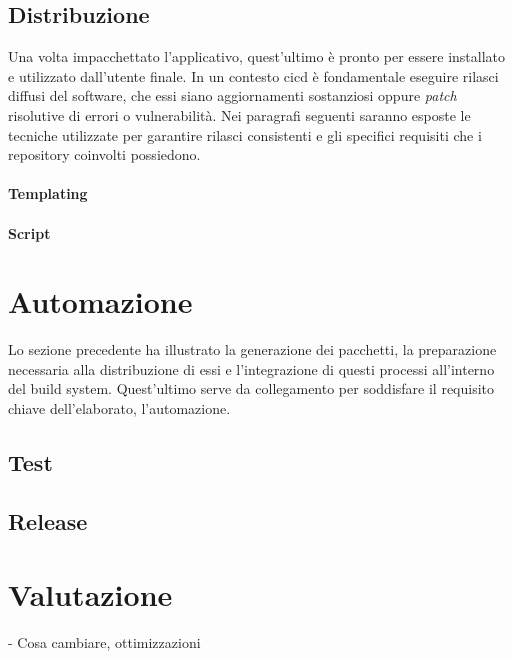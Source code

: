 
\subsection{Distribuzione}

Una volta impacchettato l'applicativo, quest'ultimo è pronto per essere installato e utilizzato dall'utente finale. In un contesto \ac{cicd} è fondamentale eseguire rilasci diffusi del software, che essi siano aggiornamenti sostanziosi oppure \textit{patch} risolutive di errori o vulnerabilità. Nei paragrafi seguenti saranno esposte le tecniche utilizzate per garantire rilasci consistenti e gli specifici requisiti che i repository coinvolti possiedono.

\paragraph{Templating}



\paragraph{Script}

\section{Automazione}
Lo sezione precedente ha illustrato la generazione dei pacchetti, la preparazione necessaria alla distribuzione di essi e l'integrazione di questi processi all'interno del build system. Quest'ultimo serve da collegamento per soddisfare il requisito chiave dell'elaborato, l'automazione. 

\subsection{Test}

\subsection{Release}

\section{Valutazione}

- Cosa cambiare, ottimizzazioni